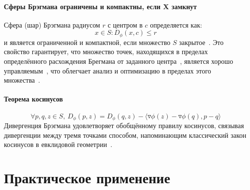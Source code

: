 \documentclass[12pt]{scrartcl}
\begin{document}
\paragraph{Сферы Брэгмана ограничены и компактны, если X замкнут}\label{par:bregman_balls}
Сфера (шар) Брэгмана радиусом $r$ с центром в $c$ определяется как:
\begin{equation}
    {x \in S:D_{\phi}(x,c) \leq r}
\end{equation}
и является ограниченной и компактной, если множество $S$ закрытое~\cite{Nielsen2007}. Это свойство гарантирует, что множество точек, находящихся в пределах определённого расхождения Брегмана от заданного центра~\cite{Nielsen2011}, является хорошо управляемым~\cite{Nielsen2006}, что облегчает анализ и оптимизацию в пределах этого множества~\cite{Boissonnat2010}.
\paragraph{Теорема косинусов}\label{par:cosine_rule}
\begin{equation}
    \forall p,q,z \in S,\ D_{\phi}(p,z) = D_{\phi}(q,z) - \langle \triangledown \phi (z) - \triangledown \phi (q), p -q \rangle
\end{equation}
Дивергенция Брэгмана удовлетворяет обобщённому правилу косинусов, связывая дивергенции между тремя точками способом, напоминающим классический закон косинусов в евклидовой геометрии~\cite{Adamcik2014}.

\section{Практическое применение}\label{sec:Case}






\printbibliography
\end{document}
